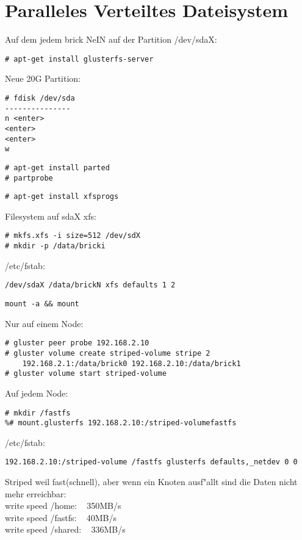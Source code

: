 \section{Paralleles Verteiltes Dateisystem}
Auf dem jedem brick NeIN auf der Partition /dev/sdaX:
\begin{lstlisting}[style=Bash]
# apt-get install glusterfs-server
\end{lstlisting}
Neue 20G Partition:
\begin{lstlisting}[style=Bash]
# fdisk /dev/sda
---------------
n <enter>
<enter>
<enter>
w
\end{lstlisting}
\begin{lstlisting}[style=Bash]
# apt-get install parted
# partprobe
\end{lstlisting}
\begin{lstlisting}[style=Bash]
# apt-get install xfsprogs
\end{lstlisting}
Filesystem auf sdaX xfs:
\begin{lstlisting}[style=Bash]
# mkfs.xfs -i size=512 /dev/sdX
# mkdir -p /data/bricki
\end{lstlisting}
/etc/fstab:
\begin{lstlisting}[style=Bash]
/dev/sdaX /data/brickN xfs defaults 1 2
\end{lstlisting}
\begin{lstlisting}[style=Bash]
mount -a && mount
\end{lstlisting}
Nur auf einem Node:
\begin{lstlisting}[style=Bash]
# gluster peer probe 192.168.2.10
# gluster volume create striped-volume stripe 2 
    192.168.2.1:/data/brick0 192.168.2.10:/data/brick1
# gluster volume start striped-volume
\end{lstlisting}
Auf jedem Node:
\begin{lstlisting}[style=Bash]
# mkdir /fastfs 
%# mount.glusterfs 192.168.2.10:/striped-volumefastfs
\end{lstlisting}
/etc/fstab:
\begin{lstlisting}[style=Bash]
192.168.2.10:/striped-volume /fastfs glusterfs defaults,_netdev 0 0
\end{lstlisting}
Striped weil fast(schnell), aber wenn ein Knoten ausf"allt sind die Daten nicht mehr erreichbar:\\
write speed /home: ~ 350MB/s\\
write speed /fastfs: ~ 40MB/s\\
write speed /shared: ~ 336MB/s\\
